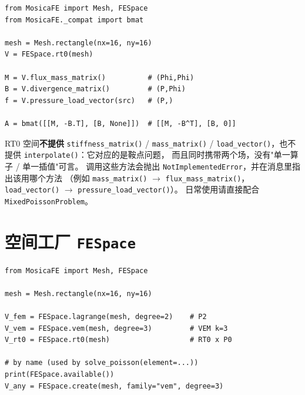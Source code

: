 \documentclass[UTF8,11pt,oneside]{ctexbook}
\theoremstyle{definition}
\theoremstyle{plain}
\newenvironment{caution}{%
  \begin{tcolorbox}[colback=orange!5,colframe=orange!55,title=注意,fonttitle=\bfseries]%
}{%
  \end{tcolorbox}%
}
\newcommand{\code}[1]{\texttt{#1}}
\begin{document}
\begin{lstlisting}[language=MosicaFE,caption={示例 5.4：直接使用两个块}]
from MosicaFE import Mesh, FESpace
from MosicaFE._compat import bmat

mesh = Mesh.rectangle(nx=16, ny=16)
V = FESpace.rt0(mesh)

M = V.flux_mass_matrix()          # (Phi,Phi)
B = V.divergence_matrix()         # (P,Phi)
f = V.pressure_load_vector(src)   # (P,)

A = bmat([[M, -B.T], [B, None]])  # [[M, -B^T], [B, 0]]
\end{lstlisting}

\begin{caution}
RT0 空间\textbf{不提供} \code{stiffness\_\allowbreak matrix()} / \code{mass\_\allowbreak matrix()} /
\code{load\_\allowbreak vector()}，也不提供 \code{interpolate()}：它对应的是鞍点问题，
而且同时携带两个场，没有"单一算子 / 单一插值"可言。
调用这些方法会抛出 \code{NotImplementedError}，并在消息里指出该用哪个方法
（例如 \code{mass\_\allowbreak matrix()} $\to$ \code{flux\_\allowbreak mass\_\allowbreak matrix()}，
\code{load\_\allowbreak vector()} $\to$ \code{pressure\_\allowbreak load\_\allowbreak vector()}）。
日常使用请直接配合 \code{MixedPoissonProblem}。
\end{caution}

\section{空间工厂 \code{FESpace}}

\begin{lstlisting}[language=MosicaFE,caption={示例 5.4：三种空间族}]
from MosicaFE import Mesh, FESpace

mesh = Mesh.rectangle(nx=16, ny=16)

V_fem = FESpace.lagrange(mesh, degree=2)    # P2
V_vem = FESpace.vem(mesh, degree=3)         # VEM k=3
V_rt0 = FESpace.rt0(mesh)                   # RT0 x P0

# by name (used by solve_poisson(element=...))
print(FESpace.available())
V_any = FESpace.create(mesh, family="vem", degree=3)
\end{lstlisting}
\end{document}

